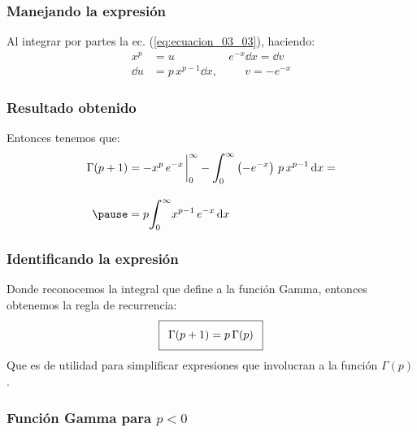 \documentclass[12pt]{beamer}
\begin{document}
\begin{frame}
\frametitle{Manejando la expresión}
Al integrar por partes la ec. (\ref{eq:ecuacion_03_03}), haciendo:
\pause
\begin{align*}
x^{p} &=  u \hspace{2cm} e^{-x} \dd{x} =  \dd{v} \\[1em]
\dd{u} &= p \, x^{p-1} \dd{x}, \hspace{1cm} v = - e^{-x}
\end{align*}
\end{frame}
\begin{frame}
\frametitle{Resultado obtenido}
Entonces tenemos que:
\pause
\begin{eqnarray*}
\begin{aligned}
\Gamma (p+1) &= -x^{p} \, e^{-x} \displaystyle \eval_{0}^{\infty} - \displaystyle \scaleint{6ex}_{\bs 0}^{\infty} \left(-e^{-x} \right) \, p \, x^{p-1} \dd{x} = \\[1em] \pause
&= p \displaystyle \scaleint{6ex}_{\bs 0}^{\infty} x^{p-1} \, e^{-x} \dd{x}
\end{aligned}
\end{eqnarray*}
\end{frame}
\begin{frame}
\frametitle{Identificando la expresión}
Donde reconocemos la integral que define a la función Gamma, entonces obtenemos la regla de recurrencia:  
\pause
\begin{align}\addtolength{\fboxsep}{5pt}\boxed{
\Gamma (p + 1) = p \, \Gamma (p)}
\label{eq:ecuacion_03_04}
\end{align}
Que es de utilidad para simplificar expresiones que involucran a la función $\Gamma (p)$.
\end{frame}

\subsubsection{Función Gamma para \texorpdfstring{$p < 0$}{p < 0}}
\end{document}
